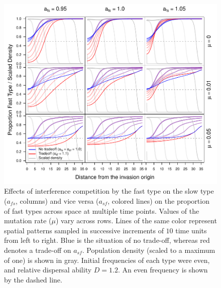 \documentclass[11pt]{article}
\begin{document}
\begin{figure}[!ht]
\begin{center}
\includegraphics[width=4.68in]{../output/clines_asf.pdf}
\end{center}
\caption{
Effects of interference competition by the fast type on the slow type ($a_{fs}$, columns) and vice versa ($a_{sf}$, colored lines) on the proportion of fast types across space at multiple time points. Values of the mutation rate ($\mu$) vary across rows. Lines of the same color represent spatial patterns sampled in successive increments of $10$ time units from left to right. Blue is the situation of no trade-off, whereas red denotes a trade-off on $a_{sf}$. Population density (scaled to a maximum of one) is shown in gray. Initial frequencies of each type were even, and relative dispersal ability $D=1.2$. An even frequency is shown by the dashed line.
}
\label{fcline_asf}
\end{figure}
\end{document}
